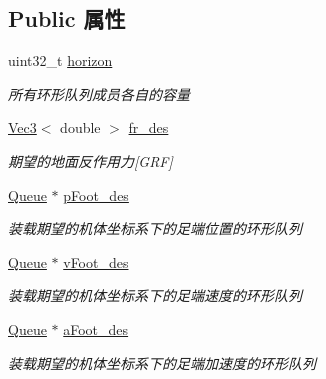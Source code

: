 \subsection*{Public 属性}
\begin{DoxyCompactItemize}
\item 
\mbox{\label{classquadruped_1_1LegPlan_a5f79241f88ccfbfe3ba5c6550006bdde}} 
uint32\+\_\+t \hyperlink{classquadruped_1_1LegPlan_a5f79241f88ccfbfe3ba5c6550006bdde}{horizon}
\begin{DoxyCompactList}\small\item\em 所有环形队列成员各自的容量 \end{DoxyCompactList}\item 
\mbox{\label{classquadruped_1_1LegPlan_a63a8d5892caa225073ab52280664b4c0}} 
\hyperlink{cppTypes_8h_a65c27bf97693676535dd0b30ea0ad399}{Vec3}$<$ double $>$ \hyperlink{classquadruped_1_1LegPlan_a63a8d5892caa225073ab52280664b4c0}{fr\+\_\+des}
\begin{DoxyCompactList}\small\item\em 期望的地面反作用力\mbox{[}G\+RF\mbox{]} \end{DoxyCompactList}\item 
\mbox{\label{classquadruped_1_1LegPlan_a279f5dec717a95dca5db78ef5649a2e8}} 
\hyperlink{classquadruped_1_1Queue}{Queue} $\ast$ \hyperlink{classquadruped_1_1LegPlan_a279f5dec717a95dca5db78ef5649a2e8}{p\+Foot\+\_\+des}
\begin{DoxyCompactList}\small\item\em 装载期望的机体坐标系下的足端位置的环形队列 \end{DoxyCompactList}\item 
\mbox{\label{classquadruped_1_1LegPlan_a558521fd909524c327778ef5bb493113}} 
\hyperlink{classquadruped_1_1Queue}{Queue} $\ast$ \hyperlink{classquadruped_1_1LegPlan_a558521fd909524c327778ef5bb493113}{v\+Foot\+\_\+des}
\begin{DoxyCompactList}\small\item\em 装载期望的机体坐标系下的足端速度的环形队列 \end{DoxyCompactList}\item 
\mbox{\label{classquadruped_1_1LegPlan_a4f2ea09a5ce3d6fd46dad767f38b275e}} 
\hyperlink{classquadruped_1_1Queue}{Queue} $\ast$ \hyperlink{classquadruped_1_1LegPlan_a4f2ea09a5ce3d6fd46dad767f38b275e}{a\+Foot\+\_\+des}
\begin{DoxyCompactList}\small\item\em 装载期望的机体坐标系下的足端加速度的环形队列 \end{DoxyCompactList}\end{DoxyCompactItemize}


